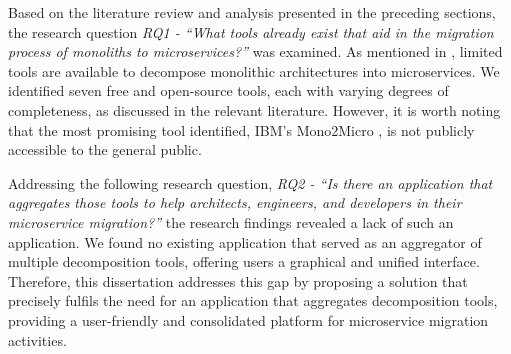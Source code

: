 Based on the literature review and analysis presented in the preceding
sections, the research question \textit{RQ1 - ``What tools already exist that
aid in the migration process of monoliths to microservices?''} was examined. As
mentioned in , limited tools are
available to decompose monolithic architectures into microservices. We
identified seven free and open-source tools, each with varying degrees of
completeness, as discussed in the relevant literature. However, it is worth
noting that the most promising tool identified, IBM's Mono2Micro
, is
not publicly accessible to the general public.

Addressing the following research question, \textit{RQ2 - ``Is there an
  application that aggregates those tools to help architects, engineers, and
developers in their microservice migration?''} the research findings revealed a
lack of such an application. We found no existing application that served as an
aggregator of multiple decomposition tools, offering users a graphical and
unified interface. Therefore, this dissertation addresses this gap by proposing
a solution that precisely fulfils the need for an application that aggregates
decomposition tools, providing a user-friendly and consolidated platform for
microservice migration activities.
